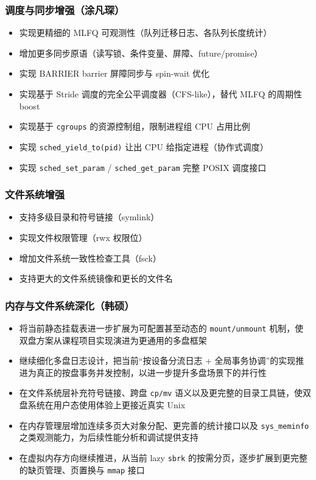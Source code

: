 \documentclass[12pt,a4paper]{ctexart}
\begin{document}
\subsubsection{调度与同步增强（涂凡琛）}
\begin{itemize}
  \item 实现更精细的 MLFQ 可观测性（队列迁移日志、各队列长度统计）
  \item 增加更多同步原语（读写锁、条件变量、屏障、future/promise）
  \item 实现 BARRIER barrier 屏障同步与 spin-wait 优化
  \item 实现基于 Stride 调度的完全公平调度器（CFS-like），替代 MLFQ 的周期性 boost
  \item 实现基于 \texttt{cgroups} 的资源控制组，限制进程组 CPU 占用比例
  \item 实现 \texttt{sched\_yield\_to(pid)} 让出 CPU 给指定进程（协作式调度）
  \item 实现 \texttt{sched\_set\_param} / \texttt{sched\_get\_param} 完整 POSIX 调度接口
\end{itemize}

\subsubsection{文件系统增强}
\begin{itemize}
  \item 支持多级目录和符号链接（symlink）
  \item 实现文件权限管理（rwx 权限位）
  \item 增加文件系统一致性检查工具（fsck）
  \item 支持更大的文件系统镜像和更长的文件名
\end{itemize}

\subsubsection{内存与文件系统深化（韩硕）}
\begin{itemize}
  \item 将当前静态挂载表进一步扩展为可配置甚至动态的 \texttt{mount/unmount} 机制，使双盘方案从课程项目实现演进为更通用的多盘框架
  \item 继续细化多盘日志设计，把当前“按设备分流日志 + 全局事务协调”的实现推进为真正的按盘事务并发控制，以进一步提升多盘场景下的并行性
  \item 在文件系统层补充符号链接、跨盘 \texttt{cp/mv} 语义以及更完整的目录工具链，使双盘系统在用户态使用体验上更接近真实 Unix
  \item 在内存管理层增加连续多页大对象分配、更完善的统计接口以及 \texttt{sys\_meminfo} 之类观测能力，为后续性能分析和调试提供支持
  \item 在虚拟内存方向继续推进，从当前 lazy \texttt{sbrk} 的按需分页，逐步扩展到更完整的缺页管理、页置换与 \texttt{mmap} 接口
\end{itemize}
\end{document}
